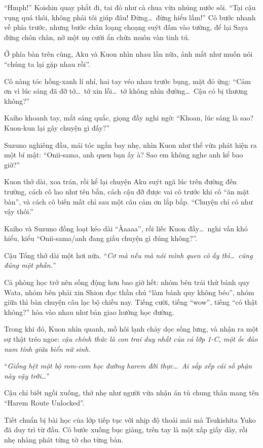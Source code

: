 \documentclass[../main.tex]{subfiles}
\begin{document}
``Hmph!'' Koishin quay phắt đi, tai đỏ như cà chua vừa nhúng nước sôi. ``Tại cậu vụng quá thôi, không phải tôi giúp đâu! Đừng\dots\ đừng hiểu lầm!'' Cô bước nhanh về phía trước, nhưng bước chân loạng choạng suýt đâm vào tường, để lại Saya đứng chôn chân, nở một nụ cười ẩn chứa muôn vàn tinh tú.

Ở phía bàn trên cùng, Aku và Kuon nhìn nhau lần nữa, ánh mắt như muốn nói ``chúng ta lại gặp nhau rồi''.

Cô nàng tóc hồng-xanh lí nhí, hai tay véo nhau trước bụng, mặt đỏ ửng: ``Cảm ơn vì lúc sáng đã đỡ tớ\dots\ tớ xin lỗi\dots\ tớ không nhìn đường\dots\ Cậu có bị thương không?''

Kaiho khoanh tay, mắt sáng quắc, giọng đầy nghi ngờ: ``Khoan, lúc sáng là sao? Kuon-kun lại gây chuyện gì đấy?''

Suzuno nghiêng đầu, mái tóc ngắn bay nhẹ, nhìn Kuon như thể vừa phát hiện ra một bí mật:
``Onii-sama, anh quen bạn ấy à? Sao em không nghe anh kể bao giờ?''

Kuon thở dài, xoa trán, rồi kể lại chuyện Aku suýt ngã lúc trên đường đến trường, cách cô lao như tên bắn, cách cậu đỡ được vai cô trước khi cô ``ăn mặt bàn'', và cách cô biến mất chỉ sau một câu cảm ơn lắp bắp. ``Chuyện chỉ có như vậy thôi.''

Kaiho và Suzuno đồng loạt kéo dài ``Àaaaa'', rồi liếc Kuon đầy\dots\ nghi vấn khó hiểu, kiểu ``Onii-sama/anh đang giấu chuyện gì đúng không?''.

Cậu Tổng thở dài một hơi nữa. ``\textit{Cơ mà nếu mà nói mình quen cô ấy thì\dots\ cũng đúng một phần.}''

Cả phòng học trở nên sống động hơn bao giờ hết: nhóm bên trái thử bánh quy Wata, nhóm bên phải xin Shion đọc thần chú ``làm bánh quy không béo'', nhóm giữa thì bàn chuyện câu lạc bộ chiều nay. Tiếng cười, tiếng ``wow'', tiếng ``có thật không?'' hòa vào nhau như bản giao hưởng học đường.

Trong khi đó, Kuon nhìn quanh, mồ hôi lạnh chảy dọc sống lưng, và nhận ra một sự thật tréo ngoe: \emph{cậu chính thức là con trai duy nhất của cả lớp 1-C, một ốc đảo nam tính giữa biển nữ sinh.}

``\textit{Giống hệt một bộ rom-com học đường harem đời thực\dots\ Ai sắp xếp cái số phận này vậy trời\dots}''

Cậu chỉ biết ngồi xuống, thở nhẹ như người vừa nhận án tù chung thân mang tên ``Harem Route Unlocked''.

\ct

Tiết chuẩn bị bài học của lớp tiếp tục với nhịp độ thoải mái mà Tsukishita Yuko đã duy trì từ đầu. Cô bước xuống bục giảng, trên tay là một xấp giấy dày, rồi nhẹ nhàng phát từng tờ cho từng bàn.
\end{document}
